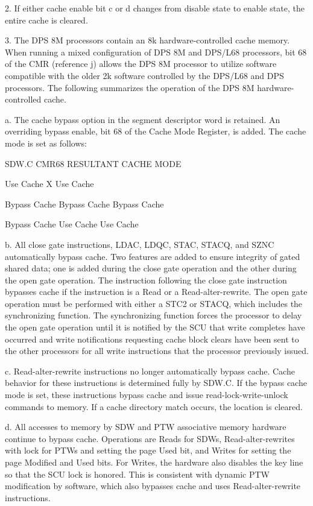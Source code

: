 2. If either cache enable bit c or d changes from disable state to enable
state, the entire cache is cleared.

3. The DPS 8M processors contain an 8k hardware-controlled cache memory. When
running a mixed configuration of DPS 8M and DPS/L68 processors, bit 68 of the
CMR (reference j) allows the DPS 8M processor to utilize software compatible
with the older 2k software controlled by the DPS/L68 and DPS processors. The
following summarizes the operation of the DPS 8M hardware-controlled cache.

a. The cache bypass option in the segment descriptor word is retained. An overriding bypass enable, bit 68 of the Cache Mode Register, is added. The cache mode is set as follows:

SDW.C CMR68 RESULTANT CACHE MODE

Use Cache X Use Cache

Bypass Cache Bypass Cache Bypass Cache

Bypass Cache Use Cache Use Cache

b. All close gate instructions, LDAC, LDQC, STAC, STACQ, and SZNC automatically
bypass cache. Two features are added to ensure integrity of gated shared data;
one is added during the close gate operation and the other during the open gate
operation. The instruction following the close gate instruction bypasses cache
if the instruction is a Read or a Read-alter-rewrite. The open gate operation
must be performed with either a STC2 or STACQ, which includes the synchronizing
function.  The synchronizing function forces the processor to delay the open
gate operation until it is notified by the SCU that write completes have
occurred and write notifications requesting cache block clears have been sent
to the other processors for all write instructions that the processor
previously issued.

c. Read-alter-rewrite instructions no longer automatically bypass cache.  Cache
behavior for these instructions is determined fully by SDW.C. If the bypass
cache mode is set, these instructions bypass cache and issue
read-lock-write-unlock commands to memory. If a cache directory match occurs,
the location is cleared.

d. All accesses to memory by SDW and PTW associative memory hardware continue
to bypass cache. Operations are Reads for SDWs, Read-alter-rewrites with lock
for PTWs and setting the page Used bit, and Writes for setting the page
Modified and Used bits. For Writes, the hardware also disables the key line so
that the SCU lock is honored. This is consistent with dynamic PTW modification
by software, which also bypasses cache and uses Read-alter-rewrite
instructions.

